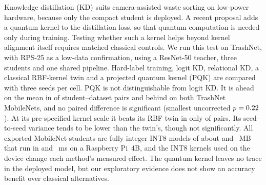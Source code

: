 Knowledge distillation (KD) suits camera-assisted waste sorting on low-power hardware, because only the compact student is deployed.
A recent proposal adds a quantum kernel to the distillation loss, so that quantum computation is needed only during training. Testing whether such a kernel helps beyond kernel alignment itself requires matched classical controls.
We run this test on TrashNet, with RPS-25 as a low-data confirmation, using a ResNet-50 teacher, three students and one shared pipeline. Hard-label training, logit KD, relational KD, a classical RBF-kernel twin and a projected quantum kernel (PQK) are compared with three seeds per cell.
PQK is not distinguishable from logit KD. It is ahead on the mean in \KdAheadFp{} of \NPairs{} student--dataset pairs and behind on both TrashNet MobileNets, and no paired difference is significant (smallest uncorrected $p=0.22$).
At its pre-specified kernel scale it beats its RBF twin in only \GtwoFixedWins{} of \NPairs{} pairs. Its seed-to-seed variance tends to be lower than the twin's, though not significantly.
All \NIntModels{} exported MobileNet students are fully integer INT8 models of about \MbMnvTwo{} and \MbMnvThree{}~MB that run in \LatMnvTwo{} and \LatMnvThree{}~ms on a Raspberry Pi~4B, and the INT8 kernels used on the device change each method's measured effect.
The quantum kernel leaves no trace in the deployed model, but our exploratory evidence does not show an accuracy benefit over classical alternatives.
